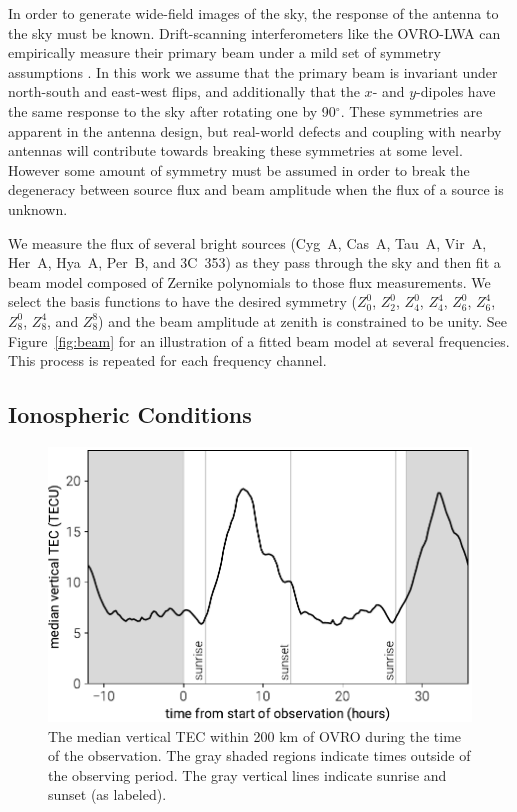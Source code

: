 \documentclass[twocolumn]{aastex61}
\begin{document}
In order to generate wide-field images of the sky, the response of the antenna to the sky must be
known. Drift-scanning interferometers like the OVRO-LWA can empirically measure their
primary beam under a mild set of symmetry assumptions \citep{2012AJ....143...53P}. In this work we
assume that the primary beam is invariant under north-south and east-west flips, and additionally
that the $x$- and $y$-dipoles have the same response to the sky after rotating one by 90$^\circ$.
These symmetries are apparent in the antenna design, but real-world defects and coupling with nearby
antennas will contribute towards breaking these symmetries at some level. However some amount of
symmetry must be assumed in order to break the degeneracy between source flux and beam amplitude
when the flux of a source is unknown.

We measure the flux of several bright sources (Cyg~A, Cas~A, Tau~A, Vir~A, Her~A, Hya~A, Per~B, and
3C~353) as they pass through the sky and then fit a beam model composed of Zernike polynomials to
those flux measurements. We select the basis functions to have the desired symmetry ($Z_0^0$,
$Z_2^0$, $Z_4^0$, $Z_4^4$, $Z_6^0$, $Z_6^4$, $Z_8^0$, $Z_8^4$, and $Z_8^8$) and the beam amplitude
at zenith is constrained to be unity. See Figure~\ref{fig:beam} for an illustration of a fitted beam
model at several frequencies. This process is repeated for each frequency channel.

\subsection{Ionospheric Conditions}

\begin{figure}[t]
    \includegraphics[width=\columnwidth]{figures/vtec/vtec}
    \caption{
        The median vertical TEC within 200 km of OVRO during the time of the observation. The gray
        shaded regions indicate times outside of the observing period. The gray vertical lines
        indicate sunrise and sunset (as labeled).
    }
    \label{fig:vtec}
\end{figure}
\end{document}

